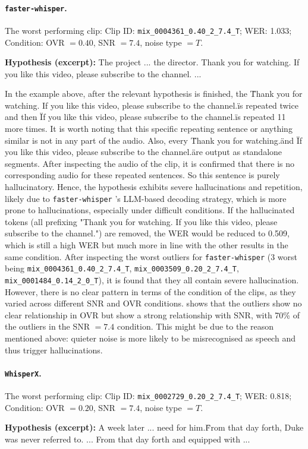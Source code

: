 \paragraph{\texttt{faster-whisper}.} The worst performing clip:
Clip ID: \texttt{mix\_0004361\_0.40\_2\_7.4\_T}; WER: 1.033; Condition: OVR $=0.40$, SNR $=7.4$, noise type $=T$.

\begin{asrexample}
\footnotesize
\textbf{Hypothesis (excerpt):}
The project ... the director. Thank you for watching. If you like this video, please subscribe to the channel. ...
\end{asrexample}
In the example above, after the relevant hypothesis is finished, the \"Thank you for watching. If you like this video, please subscribe to the channel.\" is repeated twice and then \"If you like this video, please subscribe to the channel.\" is repeated 11 more times. It is worth noting that this specific repeating sentence or anything similar is not in any part of the audio. Also, every \"Thank you for watching.\" and \"If you like this video, please subscribe to the channel.\" are output as standalone segments. After inspecting the audio of the clip, it is confirmed that there is no corresponding audio for these repeated sentences. So this sentence is purely hallucinatory. Hence, the hypothesis exhibits severe hallucinations and repetition, likely due to \texttt{faster-whisper} 's LLM-based decoding strategy, which is more prone to hallucinations, especially under difficult conditions. If the hallucinated tokens (all prefixing "Thank you for watching. If you like this video, please subscribe to the channel.") are removed, the WER would be reduced to 0.509, which is still a high WER but much more in line with the other results in the same condition. After inspecting the worst outliers for \texttt{faster-whisper} (3 worst being \texttt{mix\_0004361\_0.40\_2\_7.4\_T}, \texttt{mix\_0003509\_0.20\_2\_7.4\_T}, \texttt{mix\_0001484\_0.14\_2\_0\_T}), it is found that they all contain severe hallucination. However, there is no clear pattern in terms of the condition of the clips, as they varied across different SNR and OVR conditions.  shows that the outliers show no clear relationship in OVR but show a strong relationship with SNR, with 70\% of the outliers in the SNR $=7.4$ condition. This might be due to the reason mentioned above: quieter noise is more likely to be misrecognised as speech and thus trigger hallucinations. 


\paragraph{\texttt{WhisperX}.} The worst performing clip:
Clip ID: \texttt{mix\_0002729\_0.20\_2\_7.4\_T}; WER: 0.818; Condition: OVR $=0.20$, SNR $=7.4$, noise type $=T$.
\begin{asrexample}
\footnotesize
\textbf{Hypothesis (excerpt):}
A week later ... need for him.\" From that day forth, Duke was never referred to. ... From that day forth and equipped with ...
\end{asrexample}

